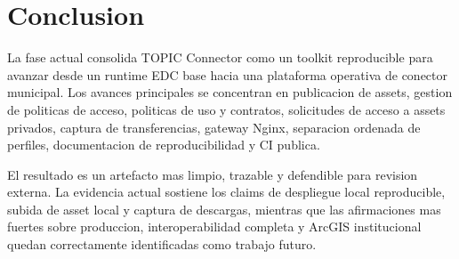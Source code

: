 \documentclass{article}
\begin{document}
\section{Conclusion}

La fase actual consolida TOPIC Connector como un toolkit reproducible para avanzar desde un runtime EDC base hacia una plataforma operativa de conector municipal. Los avances principales se concentran en publicacion de assets, gestion de politicas de acceso, politicas de uso y contratos, solicitudes de acceso a assets privados, captura de transferencias, gateway Nginx, separacion ordenada de perfiles, documentacion de reproducibilidad y CI publica.

El resultado es un artefacto mas limpio, trazable y defendible para revision externa. La evidencia actual sostiene los claims de despliegue local reproducible, subida de asset local y captura de descargas, mientras que las afirmaciones mas fuertes sobre produccion, interoperabilidad completa y ArcGIS institucional quedan correctamente identificadas como trabajo futuro.
\end{document}
